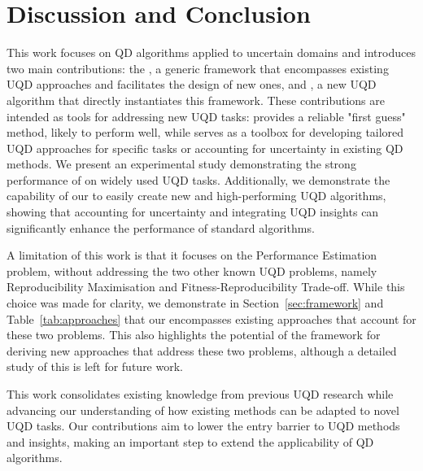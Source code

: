 \section{Discussion and Conclusion}


This work focuses on QD algorithms applied to uncertain domains and introduces two main contributions: the \framework{}, a generic framework that encompasses existing UQD approaches and facilitates the design of new ones, and \name{}, a new UQD algorithm that directly instantiates this framework.
These contributions are intended as tools for addressing new UQD tasks: \name{} provides a reliable "first guess" method, likely to perform well, while \framework{} serves as a toolbox for developing tailored UQD approaches for specific tasks or accounting for uncertainty in existing QD methods.
We present an experimental study demonstrating the strong performance of \name{} on widely used UQD tasks. Additionally, we demonstrate the capability of our \framework{} to easily create new and high-performing UQD algorithms, showing that accounting for uncertainty and integrating UQD insights can significantly enhance the performance of standard algorithms.

A limitation of this work is that it focuses on the Performance Estimation problem, without addressing the two other known UQD problems, namely Reproducibility Maximisation and Fitness-Reproducibility Trade-off. While this choice was made for clarity, we demonstrate in Section~\ref{sec:framework} and Table~\ref{tab:approaches} that our \framework{} encompasses existing approaches that account for these two problems. This also highlights the potential of the framework for deriving new approaches that address these two problems, although a detailed study of this is left for future work.

This work consolidates existing knowledge from previous UQD research while advancing our understanding of how existing methods can be adapted to novel UQD tasks. Our contributions aim to lower the entry barrier to UQD methods and insights, making an important step to extend the applicability of QD algorithms.

